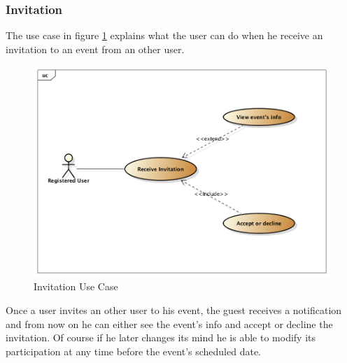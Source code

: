 \subsubsection{Invitation}
The use case in figure \ref{fig:invitusecase} explains what the user can do when he receive an invitation to an event from an other user. 
 \begin{center}
 \begin{figure}[H]
    \includegraphics[width=1\textwidth]{../UMLDiagram/use_case/Invitation/Invitation.png}
    \caption{Invitation Use Case}
     \label{fig:invitusecase}
     \end{figure}
   \end{center}  
Once a user invites an other user to his event, the guest receives a notification and from now on he can either see the event's info and accept or decline the invitation. Of course if he later changes its mind he is able to modify its participation at any time before the event's scheduled date.
